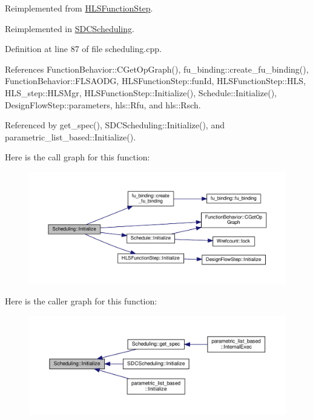 Reimplemented from \hyperlink{classHLSFunctionStep_a966629ba62a8188ff4fa783ab0d4e319}{H\+L\+S\+Function\+Step}.



Reimplemented in \hyperlink{classSDCScheduling_a6776ee26349c16c789a5b2c33c1fa9ff}{S\+D\+C\+Scheduling}.



Definition at line 87 of file scheduling.\+cpp.



References Function\+Behavior\+::\+C\+Get\+Op\+Graph(), fu\+\_\+binding\+::create\+\_\+fu\+\_\+binding(), Function\+Behavior\+::\+F\+L\+S\+A\+O\+DG, H\+L\+S\+Function\+Step\+::fun\+Id, H\+L\+S\+Function\+Step\+::\+H\+LS, H\+L\+S\+\_\+step\+::\+H\+L\+S\+Mgr, H\+L\+S\+Function\+Step\+::\+Initialize(), Schedule\+::\+Initialize(), Design\+Flow\+Step\+::parameters, hls\+::\+Rfu, and hls\+::\+Rsch.



Referenced by get\+\_\+spec(), S\+D\+C\+Scheduling\+::\+Initialize(), and parametric\+\_\+list\+\_\+based\+::\+Initialize().

Here is the call graph for this function\+:
\nopagebreak
\begin{figure}[H]
\begin{center}
\leavevmode
\includegraphics[width=350pt]{db/d2c/classScheduling_a178619eced00400e3a023a0b32784f8d_cgraph}
\end{center}
\end{figure}
Here is the caller graph for this function\+:
\nopagebreak
\begin{figure}[H]
\begin{center}
\leavevmode
\includegraphics[width=350pt]{db/d2c/classScheduling_a178619eced00400e3a023a0b32784f8d_icgraph}
\end{center}
\end{figure}


